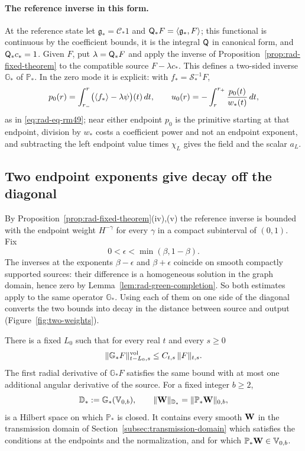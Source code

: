 \paragraph{The reference inverse in this form.}
At the reference state let $\mathfrak g_*=\mathscr C_*1$ and
$\mathsf Q_*F=\langle\mathfrak g_*,F\rangle$; this functional is
continuous by the coefficient bounds, it is the integral $\mathsf Q$ in
canonical form, and $\mathsf Q_*c_*=1$. Given $F$, put
$\lambda=\mathsf Q_*F$ and apply the inverse of
Proposition~\ref{prop:rad-fixed-theorem} to the compatible source
$F-\lambda c_*$. This defines a two-sided inverse $\mathbb G_*$ of
$\mathbb P_*$. In the zero mode it is explicit: with
$f_*=\mathscr S_*^{-1}F$,
\[
 p_0(r)=\int_{r_-}^r\bigl(\langle f_*\rangle-\lambda\psi\bigr)(t)\,dt,
 \qquad
 u_0(r)=-\int_r^{r_+}\frac{p_0(t)}{w_*(t)}\,dt ,
\]
as in \eqref{eq:rad-eq-rm49}; near either endpoint $p_0$ is the
primitive starting at that endpoint, division by $w_*$ costs a
coefficient power and not an endpoint exponent, and subtracting the
left endpoint value times $\chi_L$ gives the field and the scalar
$a_L$.

\subsection{Two endpoint exponents give decay off the diagonal}
\label{subsec:two-exponents}

By Proposition~\ref{prop:rad-fixed-theorem}(iv),(v) the reference
inverse is bounded with the endpoint weight $H^{-\gamma}$ for every
$\gamma$ in a compact subinterval of $(0,1)$. Fix
\[
 0<\epsilon<\min(\beta,1-\beta).
\]
The inverses at the exponents $\beta-\epsilon$ and $\beta+\epsilon$
coincide on smooth compactly supported sources: their difference is a
homogeneous solution in the graph domain, hence zero by
Lemma~\ref{lem:rad-green-completion}. So both estimates apply to the
same operator $\mathbb G_*$. Using each of them on one side of the
diagonal converts the two bounds into decay in the distance between
source and output (Figure~\ref{fig:two-weights}).

\begin{lemma}
\label{lem:two-weights-closed-domain}
There is a fixed $L_0$ such that for every real $t$ and every
$s\ge0$
\begin{equation}\label{eq:reference-negative-material-extension}
 \|\mathbb G_*F\|^{\rm vol}_{t-L_0,s}\le C_{t,s}\,\|F\|_{t,s} .
\end{equation}
The first radial derivative of $\mathbb G_*F$ satisfies the same
bound with at most one additional angular derivative of the source.
For a fixed integer $b\ge2$,
\begin{equation}\label{eq:fixed-base-graph-domain}
 \mathbb D_*:=\mathbb G_*(\mathbb V_{0,b}),\qquad
 \|\mathbf W\|_{\mathbb D_*}=\|\mathbb P_*\mathbf W\|_{0,b} ,
\end{equation}
is a Hilbert space on which $\mathbb P_*$ is closed. It contains
every smooth $\mathbf W$ in the transmission domain of
Section~\ref{subsec:transmission-domain} which satisfies the
conditions at the endpoints and the normalization, and for which
$\mathbb P_*\mathbf W\in\mathbb V_{0,b}$.
\end{lemma}

